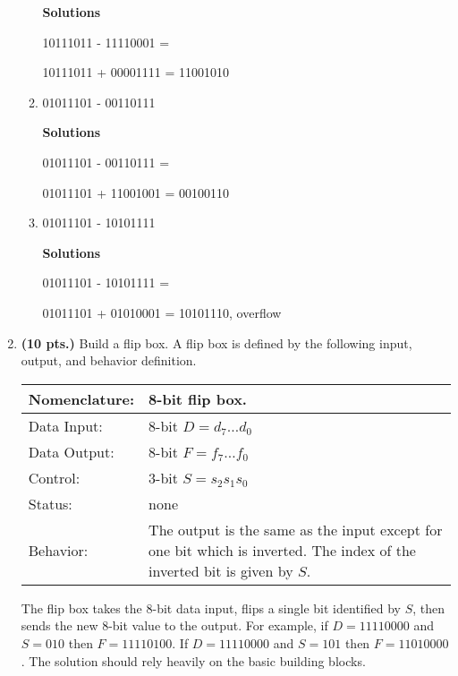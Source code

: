 \begin{enumerate}
\begin{enumerate}
\begin{onlysolution} \textbf{Solutions} \itshape{
 10111011 - 
 11110001 =

 10111011 +
 00001111 =
 11001010
} \end{onlysolution} 

\item 01011101 - 00110111 

\begin{onlysolution} \textbf{Solutions} \itshape{
 01011101 - 
 00110111 =

 01011101 +
 11001001 =
 00100110
} \end{onlysolution} 

\item 01011101 - 10101111 

\begin{onlysolution} \textbf{Solutions} \itshape{
 01011101 - 
 10101111 =

 01011101 +
 01010001 =
 10101110, overflow
} \end{onlysolution} 

\end{enumerate}


                                                                                
\item \textbf{ (10 pts.)}
\label{page:flipbox}
Build a flip box.  A flip box is defined by the following input,
output, and behavior definition.

\begin{tabular}{|l|p{3.5in}|} \hline
Nomenclature:  & 8-bit flip box.                    \\ \hline
Data Input:    & 8-bit $D=d_7 \ldots d_0$          \\ \hline
Data Output:   & 8-bit $F=f_7 \ldots f_0$          \\ \hline
Control:       & 3-bit $S=s_2 s_1 s_0$            \\ \hline
Status:        & none                                   \\ \hline
Behavior:      & The output is the same as the input except for
		one bit which is inverted.  The index of the inverted
		bit is given by $S$. \\ \hline
\end{tabular}

The flip box takes the 8-bit data input, flips a single bit identified
by $S$, then sends the new 8-bit value to the output.  
For example, if $D=11110000$ and $S=010$ then
$F=11110100$.  If $D=11110000$ and $S=101$ then $F=11010000$.  The solution
should rely heavily on the basic building blocks.


\end{enumerate}
